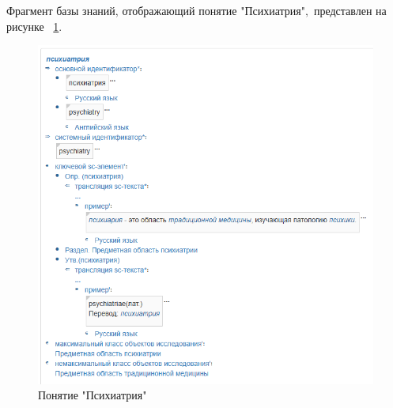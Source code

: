 Фрагмент базы знаний, отображающий понятие "Психиатрия"$,$ представлен на рисунке
~\ref{fig:sections/concept_psychiatry}.
\begin{figure}[H]
	\centering
	\includegraphics[width=1.0\textwidth]{sections/concept_psychiatry.png}
	\caption{Понятие "Психиатрия"}
	\label{fig:sections/concept_psychiatry}
\end{figure}

